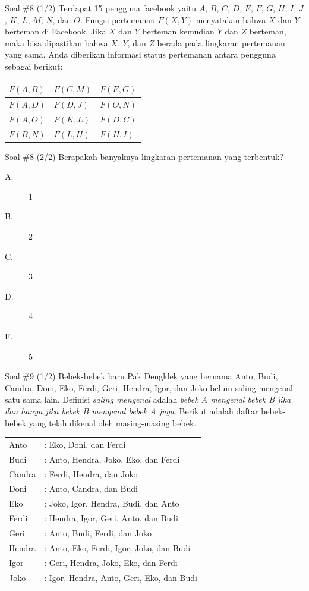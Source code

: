 \documentclass[english,t]{beamer}
\begin{document}
	\begin{frame}{Soal \#8 (1/2)}
		Terdapat 15 pengguna facebook yaitu $A$, $B$, $C$, $D$, $E$, $F$, $G$, $H$, $I$, $J$, $K$, $L$, $M$, $N$, dan $O$. Fungsi pertemanan $F(X,Y)$ menyatakan bahwa $X$ dan $Y$ berteman di Facebook. Jika $X$ dan $Y$ berteman kemudian $Y$ dan $Z$ berteman, maka bisa dipastikan bahwa $X$, $Y$, dan $Z$ berada pada lingkaran pertemanan yang sama. Anda diberikan informasi status pertemanan antara pengguna sebagai berikut:
		\begin{table}[!ht]
			\centering
			\begin{tabular}{|l|l|l|}
				\hline
				$F(A,B)$ & $F(C,M)$ & $F(E,G)$ \\
				\hline
				$F(A,D)$ & $F(D,J)$ & $F(O,N)$ \\
				\hline
				$F(A,O)$ & $F(K,L)$ & $F(D,C)$ \\
				\hline
				$F(B,N)$ & $F(L,H)$ & $F(H,I)$ \\
				\hline
			\end{tabular}
		\end{table}
	\end{frame}

	\begin{frame}{Soal \#8 (2/2)}
	Berapakah banyaknya lingkaran pertemanan yang terbentuk?
	\begin{description}
		\item[A.] 1
		\item[B.] 2
		\item[C.] 3
		\item[D.] 4
		\item[E.] 5
	\end{description}		
	\end{frame}

	\begin{frame}{Soal \#9 (1/2)}
		Bebek-bebek baru Pak Dengklek yang bernama Anto, Budi, Candra, Doni, Eko, Ferdi, Geri, Hendra, Igor, dan Joko belum saling mengenal satu sama lain. Definisi \textit{saling mengenal} adalah \textit{bebek A mengenal bebek B jika dan hanya jika bebek B mengenal bebek A juga}. Berikut adalah daftar bebek-bebek yang telah dikenal oleh masing-masing bebek.
		
		\bigskip
		\begin{tabular}{ll}
			Anto      &: Eko, Doni, dan Ferdi \\
			Budi      &: Anto, Hendra, Joko, Eko, dan Ferdi \\
			Candra    &: Ferdi, Hendra, dan Joko \\
			Doni      &: Anto, Candra, dan Budi \\
			Eko       &: Joko, Igor, Hendra, Budi, dan Anto \\
			Ferdi     &: Hendra, Igor, Geri, Anto, dan Budi \\
			Geri      &: Anto, Budi, Ferdi, dan Joko \\
			Hendra    &: Anto, Eko, Ferdi, Igor, Joko, dan Budi \\
			Igor      &: Geri, Hendra, Joko, Eko, dan Ferdi \\
			Joko      &: Igor, Hendra, Anto, Geri, Eko, dan Budi
		\end{tabular} 
	\end{frame}
\end{document}
